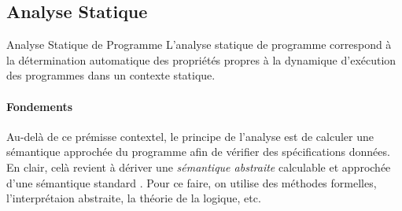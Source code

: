 \subsection{Analyse Statique}\label{sub:Analyse Statique} %

\begin{definition}{Analyse Statique de Programme}
L'analyse statique de programme correspond à la détermination automatique des propriétés propres à la dynamique d'exécution des programmes dans un contexte statique.
\end{definition}

\paragraph{Fondements}\label{par:Fondements} %
Au-delà de ce prémisse contextel, le principe de l'analyse est de calculer une sémantique approchée du programme afin de vérifier des spécifications données.
En clair, celà revient à dériver une \emph{sémantique abstraite} calculable et approchée d'une sémantique standard \cite{cousot2001abstract}.
Pour ce faire, on utilise des méthodes formelles, l'interprétaion abstraite, la théorie de la logique, etc.





